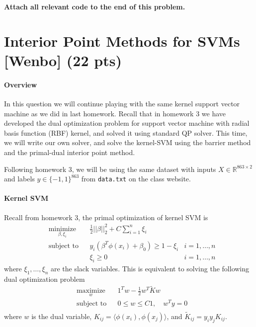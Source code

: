 \documentclass{article}
\theoremstyle{remark}
\theoremstyle{definition}
\begin{document}
\textbf{Attach all relevant code to the end of this problem.}
\section{Interior Point Methods for SVMs [Wenbo] (22 pts)}

\paragraph{Overview} In this question we will continue playing with the same kernel support vector machine as we did in last homework. Recall that in homework 3 we have developed the dual optimization problem for support vector machine with radial basis function (RBF) kernel, and solved it using standard QP solver. This time, we will write our own solver, and solve the kernel-SVM using the
barrier method and the primal-dual interior point method.

Following homework 3, we will be using the same dataset with inputs $X \in \mathbb R^{863 \times 2}$ and labels $y \in \{-1, 1\}^{863}$ from \texttt{data.txt} on the class website.

\paragraph{Kernel SVM} Recall from homework 3, the primal optimization of
kernel SVM is
$$
\begin{aligned}
& \underset{\beta, \xi_i}{\text{minimize}} && \frac{1}{2}||\beta||_2^2 + C\sum_{i=1}^n\xi_i\\
& \text{subject to} && y_i(\beta^T\phi(x_i) + \beta_0) \geq 1-\xi_i & i = 1,\ldots, n\\
& && \xi_i \geq 0 & i = 1,\ldots, n
\end{aligned}
$$
where $\xi_1, \ldots, \xi_n$ are the slack variables. This is equivalent to solving the following dual optimization problem
\begin{equation}
\label{eq:dual}
\begin{aligned} 
  & \underset{w}{\text{maximize}} && 1^Tw - \frac{1}{2}w^T \tilde{K}w \\
  & \text{subject to} && 0\leq w\leq C1, \quad w^Ty = 0\\
\end{aligned}
\end{equation}
where $w$ is the dual variable, $K_{ij} = \langle\phi(x_i), \phi(x_j)\rangle$, and $\tilde{K}_{ij} = y_iy_jK_{ij}$.
\end{document}
